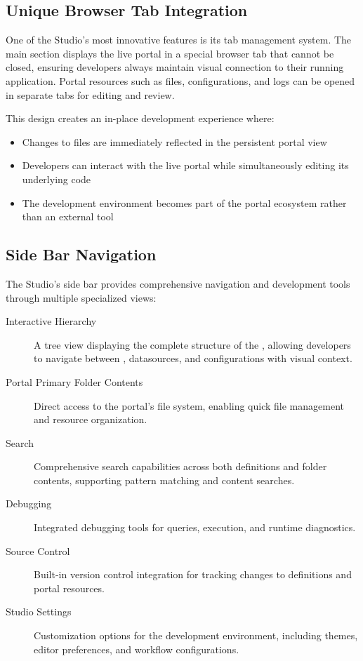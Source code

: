 \subsection{Unique Browser Tab Integration}
\label{sec:studio-browser-tab}

One of the Studio's most innovative features is its tab management system. The main section displays the live portal in a special browser tab that cannot be closed, ensuring developers always maintain visual connection to their running application. Portal resources such as files, configurations, and logs can be opened in separate tabs for editing and review.

This design creates an in-place development experience where:
\begin{itemize}
    \item Changes to \wbdl{} files are immediately reflected in the persistent portal view
    \item Developers can interact with the live portal while simultaneously editing its underlying code
    \item The development environment becomes part of the portal ecosystem rather than an external tool
\end{itemize}

\subsection{Side Bar Navigation}
\label{sec:studio-sidebar}

The Studio's side bar provides comprehensive navigation and development tools through multiple specialized views:

\begin{description}
    \item[Interactive \webbase{} Hierarchy] A tree view displaying the complete structure of the \webbase{}, allowing developers to navigate between \webbaselets{}, datasources, and configurations with visual context.
    \item[Portal Primary Folder Contents] Direct access to the portal's file system, enabling quick file management and resource organization.
    \item[Search] Comprehensive search capabilities across both \webbase{} definitions and folder contents, supporting pattern matching and content searches.
    \item[Debugging] Integrated debugging tools for \wbpl{} queries, \webbaselet{} execution, and runtime diagnostics.
    \item[Source Control] Built-in version control integration for tracking changes to \webbase{} definitions and portal resources.
    \item[Studio Settings] Customization options for the development environment, including themes, editor preferences, and workflow configurations.
\end{description}

